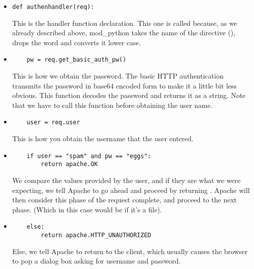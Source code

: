 \begin{itemize}

\item
  \begin{verbatim}
def authenhandler(req):
  \end{verbatim}

  This is the handler function declaration. This one is called
   because, as we already described above,
  mod_python takes the name of the directive
  (), drops the word  and converts
  it lower case.

\item
  \begin{verbatim}
    pw = req.get_basic_auth_pw()
  \end{verbatim}
  
  This is how we obtain the password. The basic HTTP authentication
  transmits the password in base64 encoded form to make it a little
  bit less obvious. This function decodes the password and returns it
  as a string. Note that we have to call this function before obtaining
  the user name.

\item
  \begin{verbatim}
    user = req.user
  \end{verbatim}
  
  This is how you obtain the username that the user entered. 

\item
  \begin{verbatim}
    if user == "spam" and pw == "eggs":
        return apache.OK
  \end{verbatim}

  We compare the values provided by the user, and if they are what we
  were expecting, we tell Apache to go ahead and proceed by returning
  . Apache will then consider this phase of the
  request complete, and proceed to the next phase. (Which in this case
  would be  if it's a  file).

\item
  \begin{verbatim}
    else:
        return apache.HTTP_UNAUTHORIZED 
  \end{verbatim}

  Else, we tell Apache to return  to the
  client, which usually causes the browser to pop a dialog box asking
  for username and password.

\end{itemize}

